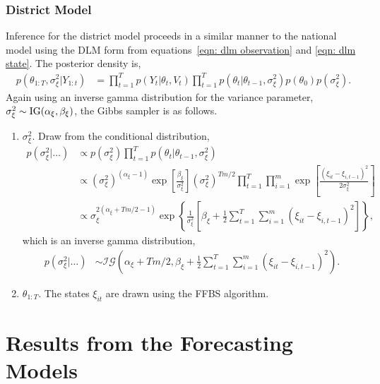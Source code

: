 \documentclass[12pt,final,fleqn]{article}
\theoremstyle{plain}
\begin{document}
\subsubsection{District Model}
Inference for the district model proceeds in a similar manner to the national model using the DLM form from equations~\ref{eqn: dlm observation} and \ref{eqn: dlm state}. The posterior density is,
\begin{align}
p(\theta_{1:T}, \sigma^2_{\xi}|Y_{1:t}) &= \prod_{t=1}^T p(Y_t|\theta_t, V_t)\prod_{t=1}^T p(\theta_t|\theta_{t-1}, \sigma^2_\xi) p(\theta_0) p(\sigma^2_\xi).
\end{align}
Again using an inverse gamma distribution for the variance parameter, $\sigma^2_\xi \sim \rm{IG}(\alpha_\xi, \beta_\xi)$, the Gibbs sampler is as follows.
\begin{enumerate}
\item $\sigma_\xi^2$. Draw from the conditional distribution,
\begin{align}
p(\sigma_\xi^2|\ldots)&\propto p(\sigma_\xi^2) \prod_{t=1}^T p(\theta_{t}|\theta_{t-1}, \sigma_\xi^2) \\
&\propto (\sigma_\xi^2)^{(\alpha_\xi - 1)}\exp\left[\frac{\beta_\xi}{\sigma_\xi^2}\right](\sigma_\xi^2)^{Tm/2} \prod_{t=1}^T \prod_{i=1}^m \exp\left[\frac{(\xi_{it} - \xi_{i,t-1})^2}{2\sigma_\xi^2}\right]\\
&\propto \sigma_\xi^{2(\alpha_\xi + Tm/2 - 1)}\exp\left\{\frac{1}{\sigma_\xi^2}\left[\beta_\xi + \frac{1}{2}\sum_{t=1}^T \sum_{i=1}^m (\xi_{it} - \xi_{i,t-1})^2\right]\right\},
\end{align}
which is an inverse gamma distribution,
\begin{align}
p(\sigma_\xi^2|\ldots)&\sim \mathcal{IG}\left(\alpha_\xi + Tm/2, \beta_\xi + \frac{1}{2}\sum_{t=1}^T \sum_{i=1}^m (\xi_{it} - \xi_{i,t-1})^2  \right).
\end{align}
\item $\theta_{1:T}$. The states $\xi_{it}$ are drawn using the FFBS algorithm.
\end{enumerate}

\section{Results from the Forecasting Models}
\end{document}
